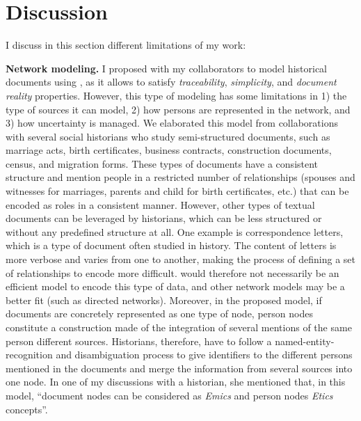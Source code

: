 \section{Discussion}\label{sec:discussion}

I discuss in this section different limitations of my work:

\noindent\textbf{Network modeling.} I proposed with my collaborators to model historical documents using \modelplural, as it allows to satisfy \emph{traceability}, \emph{simplicity}, and \emph{document reality} properties. However, this type of modeling has some limitations in 1) the type of sources it can model, 2) how persons are represented in the network, and 3) how uncertainty is managed.
We elaborated this model from collaborations with several social historians who study semi-structured documents, such as marriage acts, birth certificates, business contracts, construction documents, census, and migration forms.
These types of documents have a consistent structure and mention people in a restricted number of relationships (spouses and witnesses for marriages, parents and child for birth certificates, etc.) that can be encoded as roles in a consistent manner.
However, other types of textual documents can be leveraged by historians, which can be less structured or without any predefined structure at all.
One example is correspondence letters, which is a type of document often studied in history\cite{rollingerCicerosSupplicatioUnd2017, edelsteinHistoricalResearchDigital2017}.
The content of letters is more verbose and varies from one to another, making the process of defining a set of relationships to encode more difficult.
\modelpluralcapital would therefore not necessarily be an efficient model to encode this type of data, and other network models may be a better fit (such as directed networks).
Moreover, in the proposed model, if documents are concretely represented as one type of node, person nodes constitute a construction made of the integration of several mentions of the same person different sources.
Historians, therefore, have to follow a named-entity-recognition and disambiguation process to give identifiers to the different persons mentioned in the documents and merge the information from several sources into one node.
In one of my discussions with a historian, she mentioned that, in this model, ``document nodes can be considered as \emph{Emics} and person nodes \emph{Etics} concepts''\cite{headlandEmicsEticsInsider1990}.
